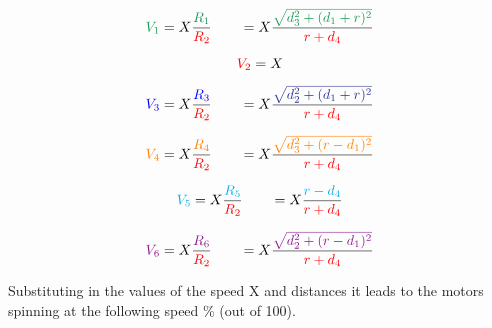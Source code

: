\documentclass[12pt]{article}
\begin{document}
\begin{equation}
	\textcolor{ForestGreen}{V_1} = X \frac{\textcolor{ForestGreen}{R_1}}{\textcolor{red}{R_2}} \qquad = X \frac{\textcolor{ForestGreen}{\sqrt{d_3^2 + (d_1 + r)^2}}}{\textcolor{red}{r + d_4}}
\end{equation}

\begin{equation}
	\textcolor{red}{V_2} = X 
\end{equation}

\begin{equation}
	\textcolor{blue}{V_3} = X \frac{\textcolor{blue}{R_3}}{\textcolor{red}{R_2}} \qquad  = X \frac{\textcolor{Blue}{\sqrt{d_2^2 + (d_1 + r)^2}}}{\textcolor{red}{r + d_4}}
\end{equation}

\begin{equation}
	\textcolor{orange}{V_4} = X \frac{\textcolor{orange}{R_4}}{\textcolor{red}{R_2}} \qquad =  X \frac{\textcolor{orange}{\sqrt{d_3^2 + ( r - d_1)^2}}}{\textcolor{red}{r + d_4}}
\end{equation}

\begin{equation}
	\textcolor{cyan}{V_5} = X \frac{\textcolor{cyan}{R_5}}{\textcolor{red}{R_2}} \qquad =  X \frac{\textcolor{cyan}{r - d_4}}{\textcolor{red}{r + d_4}}
\end{equation}

\begin{equation}
	\textcolor{Plum}{V_6} = X \frac{\textcolor{Plum}{R_6}}{\textcolor{red}{R_2}} \qquad = X \frac{\textcolor{Plum}{\sqrt{d_2^2 + (r-d_1)^2}}}{\textcolor{red}{r + d_4}}
\end{equation}

\noindent Substituting in the values of the speed X and distances it leads to the motors spinning at the following speed \% (out of 100).

\bigskip
\end{document}
